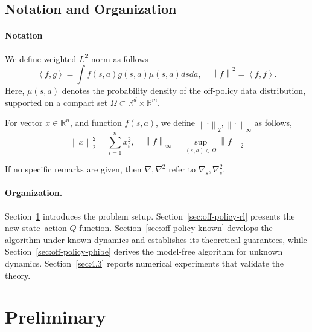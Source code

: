 \documentclass[12pt]{article}
\def\O{\Omega}
\def\R{\mathbb R}
\def\la{\left\langle}
\def\ra{\right\rangle}
\def\ll{\left\lVert}
\def\rl{\right\rVert}
\def\nb{\nabla}
\begin{document}
\subsection{Notation and Organization}
\paragraph{Notation} We define weighted $L^2$-norm as follows
\[
\la f, g\ra = \int f(s,a) g(s,a) \mu(s,a) dsda, \quad \ll f \rl^2 =\la f, f \ra.
\]
Here, $\mu(s,a)$ denotes the probability density of the off-policy data distribution, supported on a compact set $\Omega \subset \mathbb{R}^{d}\times \mathbb{R}^{m}$.

For vector $x\in \R^n$, and function $f(s,a)$, we define $\ll \cdot \rl_2, \ll \cdot \rl_\infty$ as follows,
\[
\ll x \rl^2_2 = \sum_{i=1}^n x_i^2, \quad \ll f \rl_\infty = \sup_{(s,a)\in\O} \ll f \rl_2
\]

If no specific remarks are given, then $\nb, \nb^2$ refer to $\nb_s, \nb^2_s$. 



\paragraph{Organization.}
Section~\ref{sec:preliminary} introduces the problem setup. 
Section~\ref{sec:off-policy-rl} presents the new state--action $Q$-function. 
Section~\ref{sec:off-policy-known} develops the algorithm under known dynamics and establishes its theoretical guarantees, while Section~\ref{sec:off-policy-phibe} derives the model-free algorithm for unknown dynamics. 
Section~\ref{sec:4.3} reports numerical experiments that validate the theory.



\section{Preliminary}\label{sec:preliminary}
\end{document}
